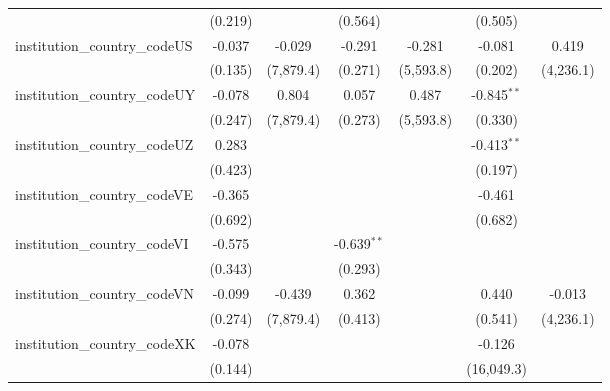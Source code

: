 \begin{tabular}{lcccccc}
                                         & (0.219)        &               & (0.564)        &               & (0.505)        &   \\   
   institution\_country\_codeUS          & -0.037         & -0.029        & -0.291         & -0.281        & -0.081         & 0.419\\   
                                         & (0.135)        & (7,879.4)     & (0.271)        & (5,593.8)     & (0.202)        & (4,236.1)\\   
   institution\_country\_codeUY          & -0.078         & 0.804         & 0.057          & 0.487         & -0.845$^{**}$  &   \\   
                                         & (0.247)        & (7,879.4)     & (0.273)        & (5,593.8)     & (0.330)        &   \\   
   institution\_country\_codeUZ          & 0.283          &               &                &               & -0.413$^{**}$  &   \\   
                                         & (0.423)        &               &                &               & (0.197)        &   \\   
   institution\_country\_codeVE          & -0.365         &               &                &               & -0.461         &   \\   
                                         & (0.692)        &               &                &               & (0.682)        &   \\   
   institution\_country\_codeVI          & -0.575         &               & -0.639$^{**}$  &               &                &   \\   
                                         & (0.343)        &               & (0.293)        &               &                &   \\   
   institution\_country\_codeVN          & -0.099         & -0.439        & 0.362          &               & 0.440          & -0.013\\   
                                         & (0.274)        & (7,879.4)     & (0.413)        &               & (0.541)        & (4,236.1)\\   
   institution\_country\_codeXK          & -0.078         &               &                &               & -0.126         &   \\   
                                         & (0.144)        &               &                &               & (16,049.3)     &   \\   

\end{tabular}
